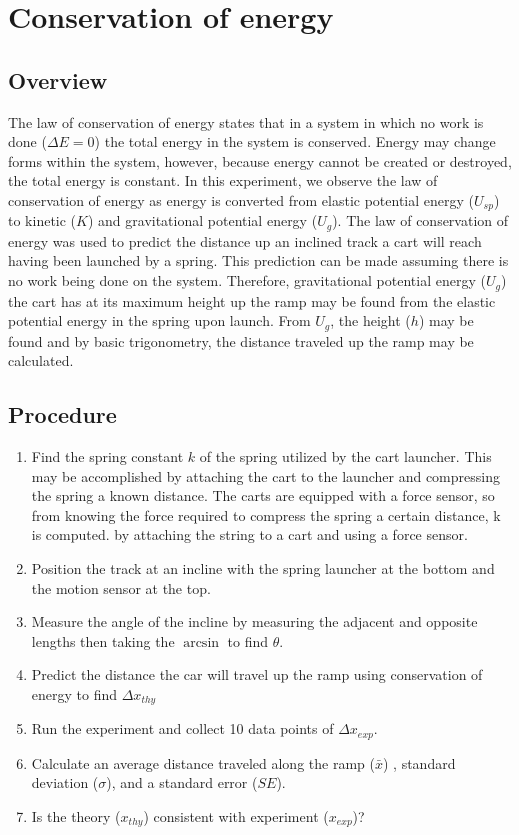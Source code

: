 \documentclass[11pt, letterpaper, includehead]{article}
\begin{document}
\section{Conservation of energy}
\subsection{Overview}
The law of conservation of energy states that in a system in which no work is done
($\Delta E = 0$) the total energy in the system is conserved. Energy may change forms 
within the system, however, because energy cannot be created or destroyed, the total energy is constant. In this experiment, we observe the law of conservation of energy as energy is 
converted from elastic potential energy ($U_{sp}$) to kinetic ($K$) and gravitational potential 
energy ($U_g$). The law of conservation of energy was used to predict the distance up an inclined track 
a cart will reach having been launched by a spring. This prediction can be made assuming there
is no work being done on the system. Therefore, gravitational potential energy ($U_g$) the cart has at its maximum height up the ramp 
may be found from the elastic potential energy in the spring upon launch. From $U_g$, the height ($h$) may be found
and by basic trigonometry, the distance traveled up the ramp may be calculated.

\subsection{Procedure}
\begin{enumerate} 
  \item Find the spring constant $k$ of the spring utilized by the cart launcher. 
  This may be accomplished by attaching the cart to the launcher and compressing the 
  spring a known distance. The carts are equipped with a force sensor, so from knowing the force 
  required to compress the spring a certain distance, k is computed.
  by attaching the string to a cart and using a force sensor.
  \item Position the track at an incline with the spring launcher at the bottom 
        and the motion sensor at the top. 
  \item Measure the angle of the incline by measuring the adjacent and opposite lengths
  then taking the $\arcsin$ to find $\theta$.
  \item Predict the distance the car will travel up the ramp using conservation of energy to find $\Delta x_{thy}$
  \item Run the experiment and collect 10 data points of $\Delta x_{exp}$.
  \item Calculate an average distance traveled along the ramp ($\bar{x}$) , standard deviation 
  ($\sigma$), and a standard error ($SE$).
  \item Is the theory ($x_{thy}$) consistent with experiment ($x_{exp}$)?
\end{enumerate}
\end{document}
